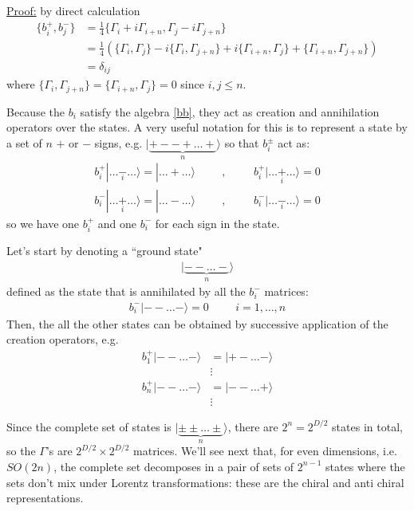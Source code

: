 \documentclass[a4paper,12pt]{article}
\numberwithin{equation}{section}
\numberwithin{exe}{section}
\newcommand{\G}{{\Gamma}}
\newcommand{\ket}[1]{| #1 \rangle}
\begin{document}
\underline{Proof:} by direct calculation
	\begin{align}\label{}
	\{ b_i^+ , b^-_j \} &= \frac{1}{4}\{ \G_i + i \G_{i+n} , \G_j -i \G_{j+n} \} \nonumber  \\
	&=\frac{1}{4}  \left( \{ \G_i, \G_j \} - i\{ \G_i, \G_{j+n} \}+i\{ \G_{i+n},\G_j \}+ \{ \G_{i+n},\G_{j+n} \} \right) \nonumber \\
	&=\delta_{ij} 
	\end{align}
where $\{ \G_i, \G_{j+n} \}=\{ \G_{i+n},\G_j \}=0$ since $i,j\leq n$.

Because the $b_i$ satisfy the algebra \eqref{bb}, they act as creation and annihilation operators over the states. A very useful notation for this is to represent a state by a set of $n$ $+$ or $-$ signs, e.g. $\ket{\underbrace{+--+\hdots +}_{n}}$ so that $b_i^\pm$ act as:
	\begin{align}\label{}
	b_i^+ \ket{\hdots \underset{i}{-} \hdots}=\ket{\hdots + \hdots} \hspace{1cm},\hspace{1cm} b_i^+ \ket{\hdots \underset{i}{+} \hdots}=0\\
	b_i^- \ket{\hdots \underset{i}{+} \hdots}=\ket{\hdots - \hdots} \hspace{1cm},\hspace{1cm} b_i^- \ket{\hdots \underset{i}{-} \hdots}=0
	\end{align}
so we have one $b_i^+$ and one $b_i^-$ for each sign in the state.

Let's start by denoting a ``ground state"
	\begin{align}\label{}
	\ket{\underbrace{--\hdots -}_{n}}
	\end{align}
defined as the state that is annihilated by all the $b_i^-$ matrices:
	\begin{align}\label{}
	b_i^- \ket{--\hdots -} =0 \hspace{1cm} i=1,\hdots,n
	\end{align}
Then, the all the other states can be obtained by successive application of the creation operators, e.g.   
	\begin{align}\label{}
	b_1^+\ket{ - - \hdots - } &=\ket{+ - \hdots -}\\
	&\vdots\\
	b_n^+\ket{ - - \hdots - } &=\ket{- - \hdots +}\\
	&\vdots
	\end{align}

Since the complete set of states is $\ket{\underbrace{\pm \pm\hdots \pm}_{n}}$, there are $2^n=2^{D/2}$ states in total, so the $\G$'s are $2^{D/2}\times 2^{D/2}$ matrices. We'll see next that, for even dimensions, i.e. $SO(2n)$, the complete set decomposes in a pair of sets of $2^{n-1}$ states where the sets don't mix under Lorentz transformations: these are the chiral and anti chiral representations.
\end{document}
